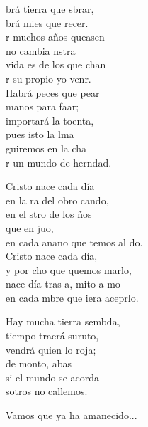 \begin{cancion}%
	brá tierra que sbrar,\\
	brá mies que recer.\\
	r muchos años queasen\\
	no cambia nstra \\
	 vida es de los que chan\\
	r su propio yo venr.\\
	\jump
	Habrá peces que pear\\
	manos para faar;\\
	 importará la toenta,\\
	pues isto la lma\\
	guiremos en la cha\\
	r un mundo de herndad. \jump\\
	\begin{chorus}%
	\jump
	Cristo nace cada día\\
		en la ra del obro cando,\\
		en el stro de los ños\\
		que en juo, \\
		en cada anano que temos al do.\\
	\jump
	Cristo nace cada día,\\
		y por cho que quemos marlo,\\
		nace día tras a, mito a mo  \\
		en cada mbre que iera aceprlo.\jump\\
	\end{chorus}%
	Hay mucha tierra sembda,\\
	 tiempo traerá suruto,\\
	 vendrá quien lo roja;\\
	de monto, abas\\
	si el mundo se acorda\\
	sotros no callemos.\jump\\
	\begin{chorus}%
	Vamos que ya ha amanecido...\jump\\
	\end{chorus}%
	\jump
\end{cancion}%
